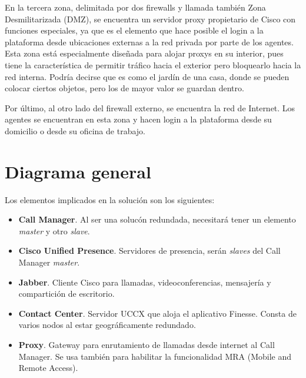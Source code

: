 \documentclass[a4paper, 12pt]{book}
\begin{document}
En la tercera zona, delimitada por dos firewalls y llamada también Zona Desmilitarizada (DMZ), se encuentra un servidor proxy propietario de Cisco con funciones especiales, ya que es el elemento que hace posible el login a la plataforma desde ubicaciones externas a la red privada por parte de los agentes. Esta zona está especialmente diseñada para alojar proxys en su interior, pues tiene la característica de permitir tráfico hacia el exterior pero bloquearlo hacia la red interna. Podría decirse que es como el jardín de una casa, donde se pueden colocar ciertos objetos, pero los de mayor valor se guardan dentro.

Por último, al otro lado del firewall externo, se encuentra la red de Internet. Los agentes se encuentran en esta zona y hacen login a la plataforma desde su domicilio o desde su oficina de trabajo.

\section{Diagrama general}
\label{sec:diagrama}
Los elementos implicados en la solución son los siguientes:
\begin{itemize}
  \item \textbf{Call Manager}. Al ser una solucón redundada, necesitará tener un elemento \emph{master} y otro \emph{slave}.
  \item \textbf{Cisco Unified Presence}. Servidores de presencia, serán \emph{slaves} del Call Manager \emph{master}.
  \item \textbf{Jabber}. Cliente Cisco para llamadas, videoconferencias, mensajería y compartición de escritorio.
  \item \textbf{Contact Center}. Servidor UCCX que aloja el aplicativo Finesse. Consta de varios nodos al estar geográficamente redundado.
  \item \textbf{Proxy}. Gateway para enrutamiento de llamadas desde internet al Call Manager. Se usa también para habilitar la funcionalidad MRA (Mobile and Remote Access).
\end{itemize}
\end{document}
